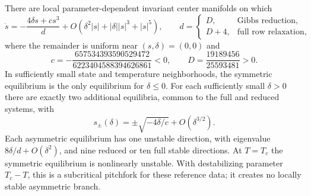 There are local parameter-dependent invariant center manifolds on which
\begin{equation}
 \dot s=-\frac{4\delta s+c s^3}{d}
       +O(\delta^2|s|+|\delta||s|^3+|s|^5),\qquad
 d=\begin{cases}D,&\text{Gibbs reduction},\\D+4,&\text{full row relaxation},\end{cases}
 \label{it2:critical-normal-form}
\end{equation}
where the remainder is uniform near $(s,\delta)=(0,0)$ and
\begin{equation}
 c=-\frac{657534393590529472}{6223404588394626861}<0,\qquad
 D=\frac{19189456}{25593481}>0.
 \label{it2:critical-constants}
\end{equation}
In sufficiently small state and temperature neighborhoods, the symmetric equilibrium is the only equilibrium for $\delta\leq0$. For each sufficiently small $\delta>0$ there are exactly two additional equilibria, common to the full and reduced systems, with
\begin{equation}
 s_\pm(\delta)=\pm\sqrt{-4\delta/c}+O(\delta^{3/2}).
 \label{it2:critical-branches}
\end{equation}
Each asymmetric equilibrium has one unstable direction, with eigenvalue $8\delta/d+O(\delta^2)$, and nine reduced or ten full stable directions. At $T=T_c$ the symmetric equilibrium is nonlinearly unstable. With destabilizing parameter $T_c-T$, this is a subcritical pitchfork for these reference data; it creates no locally stable asymmetric branch.
